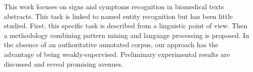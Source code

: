 This work focuses on signs and symptoms recognition in biomedical texts abstracts. This task is linked to named entity recognition but has been little studied. First, this specific task is described from a linguistic point of view. Then a methodology combining pattern mining and language processing is proposed. In the absence of an authoritative annotated corpus, our approach has the advantage of being weakly-supervised. Preliminary experimental results are discussed and reveal promising avenues.
